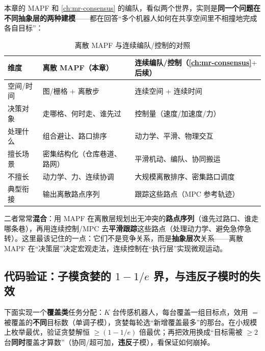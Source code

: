 本章的 MAPF 和 \cref{ch:mr-consensus} 的编队，看似两个世界，实则是\textbf{同一个问题在不同抽象层的两种建模}——都在回答“多个机器人如何在共享空间里不相撞地完成各自目标”：

\begin{table}[H]\centering\small
\caption{离散 MAPF 与连续编队/控制的对照}
\label{tab:mapf-vs-formation}
\begin{tabular}{lll}
\toprule
维度 & 离散 MAPF（本章） & 连续编队/控制（\cref{ch:mr-consensus}$+$后续） \\
\midrule
空间/时间 & 图/栅格 $+$ 离散步 & 连续空间 $+$ 连续时间 \\
决策对象 & 走哪格、何时走、谁先过 & 控制量（速度/加速度/力） \\
处理什么 & 组合避让、路口排序 & 动力学、平滑、物理交互 \\
擅长场景 & 密集结构化（仓库巷道、路网） & 平滑机动、编队、协同搬运 \\
不擅长 & 动力学、力、连续协调 & 大规模离散排序、密集路口调度 \\
典型衔接 & 输出离散路点序列 & 跟踪这些路点（MPC 参考轨迹） \\
\bottomrule
\end{tabular}
\end{table}

二者常常\textbf{混合}：用 MAPF 在离散层规划出无冲突的\textbf{路点序列}（谁先过路口、谁走哪条巷），再用连续控制/MPC 去\textbf{平滑跟踪}这些路点（处理动力学、避免急停急转）。这里最该记住的一点：它们不是竞争关系，而是\textbf{抽象层次}关系——离散 MAPF 在“决策层”决定宏观走法，连续控制在“执行层”实现微观运动。

\subsection{代码验证：子模贪婪的 $1-1/e$ 界，与违反子模时的失效}
\label{sec:mapf-submod-code}

下面实现一个\textbf{覆盖类}任务分配：$K$ 台传感机器人，每台覆盖一组目标点，效用 $=$ 被覆盖的\textbf{不同}目标数（单调子模），贪婪每轮选“新增覆盖最多”的那台。在小规模上枚举最优，验证贪婪解恒 $\ge (1-1/e)$ 倍最优；再把效用换成“目标需被 $\ge 2$ 台\textbf{同时}覆盖才算数”（协同/超可加，\textbf{违反}子模），看保证如何崩掉。

